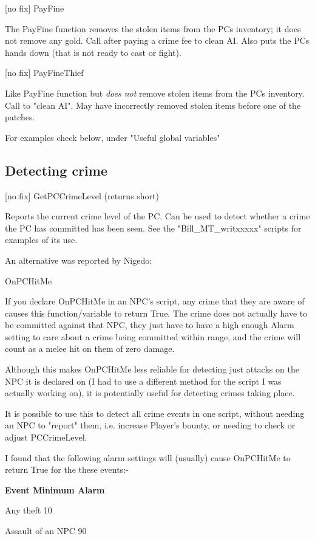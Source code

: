 {[}no fix{]} PayFine

The PayFine function removes the stolen items from the PCs inventory; it
does not remove any gold. Call after paying a crime fee to clean AI.
Also puts the PCs hands down (that is not ready to cast or fight).

{[}no fix{]} PayFineThief

Like PayFine function but \emph{does not} remove stolen items from the
PCs inventory. Call to "clean AI". May have incorrectly removed stolen
items before one of the patches.

For examples check below, under "Useful global variables"

\hypertarget{detecting-crime}{%
\subsection{Detecting crime}\label{detecting-crime}}

{[}no fix{]} GetPCCrimeLevel (returns short)

Reports the current crime level of the PC. Can be used to detect whether
a crime the PC has committed has been seen. See the
"Bill\_MT\_writxxxxx" scripts for examples of its use.

An alternative was reported by Nigedo:

OnPCHitMe

If you declare OnPCHitMe in an NPC's script, any crime that they are
aware of causes this function/variable to return True. The crime does
not actually have to be committed against that NPC, they just have to
have a high enough Alarm setting to care about a crime being committed
within range, and the crime will count as a melee hit on them of zero
damage.

Although this makes OnPCHitMe less reliable for detecting just attacks
on the NPC it is declared on (I had to use a different method for the
script I was actually working on), it is potentially useful for
detecting crimes taking place.

It is possible to use this to detect all crime events in one script,
without needing an NPC to "report" them, i.e. increase Player's bounty,
or needing to check or adjust PCCrimeLevel.

I found that the following alarm settings will (usually) cause OnPCHitMe
to return True for the these events:-

\textbf{Event Minimum Alarm}

Any theft 10

Assault of an NPC 90

